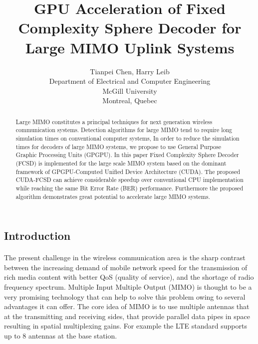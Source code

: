 \documentclass[12pt,a4paper,final]{article}
\title{GPU Acceleration of Fixed Complexity Sphere Decoder for Large MIMO Uplink Systems}
\author{Tianpei Chen, Harry Leib\\
 Department of Electrical and Computer Engineering\\
 McGill University\\
 Montreal, Quebec}
\begin{document}
\begin{spacing}{2.5}
\date{}
\maketitle

\begin{abstract}
Large MIMO constitutes a principal techniques for next generation wireless communication systems. Detection algorithms for large MIMO tend to require long simulation times on conventional computer systems, In order to reduce the simulation times for decoders of large MIMO systems, we propose to use General Purpose Graphic Processing Units (GPGPU). In this paper Fixed Complexity Sphere Decoder (FCSD) is implemented for the large scale MIMO system based on the dominant framework of GPGPU-Computed Unified Device Architecture (CUDA). The proposed CUDA-FCSD can achieve considerable speedup over conventional CPU implementation while reaching the same Bit Error Rate (BER) performance. Furthermore the proposed algorithm demonstrates great potential to accelerate large MIMO systems.
\end{abstract}





%

\section{Introduction}
 \paragraph{} The present challenge in the wireless communication area is the sharp contrast between the increasing demand of mobile network speed for the transmission of rich media content with better QoS (quality of service), and the shortage of radio frequency spectrum. Multiple Input Multiple Output (MIMO) is thought to be a very promising technology that can help to solve this problem owing to several advantages it can offer. The core idea of MIMO is to use multiple antennas that at the transmitting and receiving sides, that provide parallel data pipes in space resulting in spatial multiplexing gains\cite{oestges2010mimo}. For example the LTE standard supports up to 8 antennas at the base station\cite{dahlman20103g}. 

\end{spacing}
\end{document}
